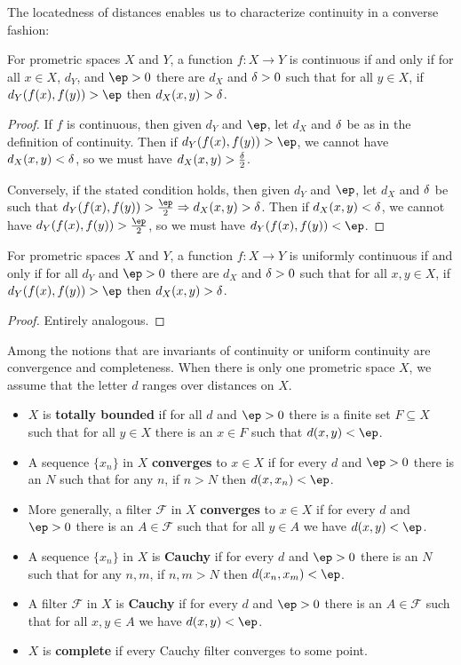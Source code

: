 \documentclass{article}
\def\F{\mathcal{F}}
\let\implies\Rightarrow
\def\hfep{\frac{\ep}{2}}
\begin{document}
The locatedness of distances enables us to characterize continuity in a converse fashion:

\begin{lem}\label{thm:cocontinuous}
  For prometric spaces $X$ and $Y$, a function $f:X\to Y$ is continuous if and only if for all $x\in X$, $d_Y$, and $\ep>0$ there are $d_X$ and $\delta>0$ such that for all $y\in X$, if $d_Y(f(x),f(y))>\ep$ then $d_X(x,y)>\delta$.
\end{lem}
\begin{proof}
  If $f$ is continuous, then given $d_Y$ and $\ep$, let $d_X$ and $\delta$ be as in the definition of continuity.
  Then if $d_Y(f(x),f(y)) > \ep$, we cannot have $d_X(x,y) < \delta$, so we must have $d_X(x,y) > \frac{\delta}{2}$.

  Conversely, if the stated condition holds, then given $d_Y$ and $\ep$, let $d_X$ and $\delta$ be such that $d_Y(f(x),f(y))>\hfep \implies d_X(x,y)>\de$.
  Then if $d_X(x,y)<\delta$, we cannot have $d_Y(f(x),f(y))>\hfep$, so we must have $d_Y(f(x),f(y))<\ep$.
\end{proof}

\begin{lem}\label{thm:unif-cocontinuous}
  For prometric spaces $X$ and $Y$, a function $f:X\to Y$ is uniformly continuous if and only if for all $d_Y$ and $\ep>0$ there are $d_X$ and $\delta>0$ such that for all $x,y\in X$, if $d_Y(f(x),f(y))>\ep$ then $d_X(x,y)>\delta$.
\end{lem}
\begin{proof}
  Entirely analogous.
\end{proof}

Among the notions that are invariants of continuity or uniform continuity are convergence and completeness.
When there is only one prometric space $X$, we assume that the letter $d$ ranges over distances on $X$.

\begin{itemize}
\item $X$ is \textbf{totally bounded} if for all $d$ and $\ep>0$ there is a finite set $F\subseteq X$ such that for all $y\in X$ there is an $x\in F$ such that $d(x,y)<\ep$.
\item A sequence $\{x_n\}$ in $X$ \textbf{converges} to $x\in X$ if for every $d$ and $\ep>0$ there is an $N$ such that for any $n$, if $n>N$ then $d(x,x_n)<\ep$.
\item More generally, a filter $\F$ in $X$ \textbf{converges} to $x\in X$ if for every $d$ and $\ep>0$ there is an $A\in\F$ such that for all $y\in A$ we have $d(x,y)<\ep$.
\item A sequence $\{x_n\}$ in $X$ is \textbf{Cauchy} if for every $d$ and $\ep>0$ there is an $N$ such that for any $n,m$, if $n,m>N$ then $d(x_n,x_m)<\ep$.
\item A filter $\F$ in $X$ is \textbf{Cauchy} if for every $d$ and $\ep>0$ there is an $A\in\F$ such that for all $x,y\in A$ we have $d(x,y)<\ep$.
\item $X$ is \textbf{complete} if every Cauchy filter converges to some point.
\end{itemize}
\end{document}
